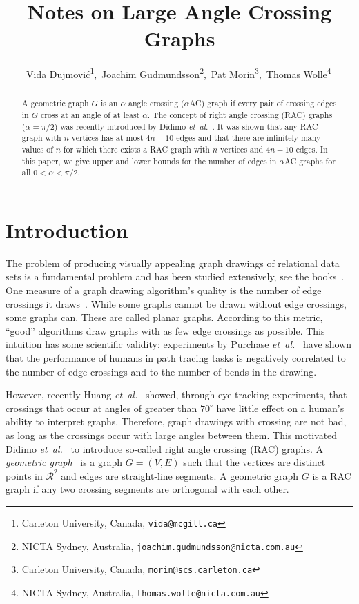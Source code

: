 \documentclass{patmorin}
\newcommand{\etal}{\emph{et~al.}}
\begin{document}
\title{Notes on Large Angle Crossing Graphs}


\author{Vida Dujmovi\'c\thanks{{Carleton University, Canada}, \texttt{vida@mcgill.ca}},\,
Joachim Gudmundsson\thanks{{NICTA Sydney, Australia}, \texttt{joachim.gudmundsson@nicta.com.au}},\,
Pat Morin\thanks{{Carleton University, Canada}, \texttt{morin@scs.carleton.ca}},\,
Thomas Wolle\thanks{{NICTA Sydney, Australia}, \texttt{thomas.wolle@nicta.com.au}}\,
}

\maketitle



\begin{abstract}
A geometric graph $G$ is an $\alpha$ angle crossing ($\alpha$AC) graph if
every pair of crossing edges in $G$ cross at an angle of at least
$\alpha$.  The concept of right angle crossing (RAC) graphs ($\alpha=\pi/2$)
was recently introduced by Didimo \etal\ \cite{del-dgrac-09}. It was
shown that any RAC graph with $n$ vertices has at most $4n-10$ edges
and that there are infinitely many values of $n$ for which there exists a RAC
graph with $n$ vertices and $4n-10$ edges.  In this paper, we give upper
and lower bounds for the number of edges in $\alpha$AC graphs for all
$0 < \alpha < \pi/2$.
\end{abstract}

\section{Introduction}

The problem of producing visually appealing graph drawings of relational data sets is a fundamental problem and has been studied extensively, see the books~\cite{bett-gd-99,jm-gds-03,kw-dgmm-01,nr-pgd-04}.
One measure of a graph drawing algorithm's quality is the number of edge crossings it draws~\cite{ew-ecdbg-94,jm-2lscm-97,kw-dgmm-01,n-ibosm-05}.
While some graphs cannot be drawn without edge crossings, some graphs can. These are called planar graphs.
According to this metric, ``good'' algorithms draw graphs with as few edge crossings as possible.
This intuition has some scientific validity:
experiments by Purchase \etal~\cite{p-eiv-00,pca-eeabg-02,wpcm-cmga-02}
have shown that the performance of humans in path tracing tasks is negatively correlated to the number of edge crossings and to the number of bends in the drawing.

However, recently Huang \etal\ \cite{h-uetig-07,h-etseg-08,hhe-eca-08} showed, through eye-tracking experiments, that crossings that occur at angles of greater than $70^\circ$ have little effect on a human's ability to interpret graphs.  Therefore, graph drawings with crossing are not bad, as long as the crossings occur with large angles between them. This motivated Didimo \etal\ \cite{del-dgrac-09} to introduce so-called right angle crossing (RAC) graphs.  A \emph{geometric graph}~\cite{ae-degg-89} is a graph $G=(V,E)$ such that the vertices are distinct points in $\mathcal{R}^2$ and edges are straight-line segments. A geometric graph $G$ is a RAC graph if any two crossing segments are orthogonal with each other.
\end{document}
